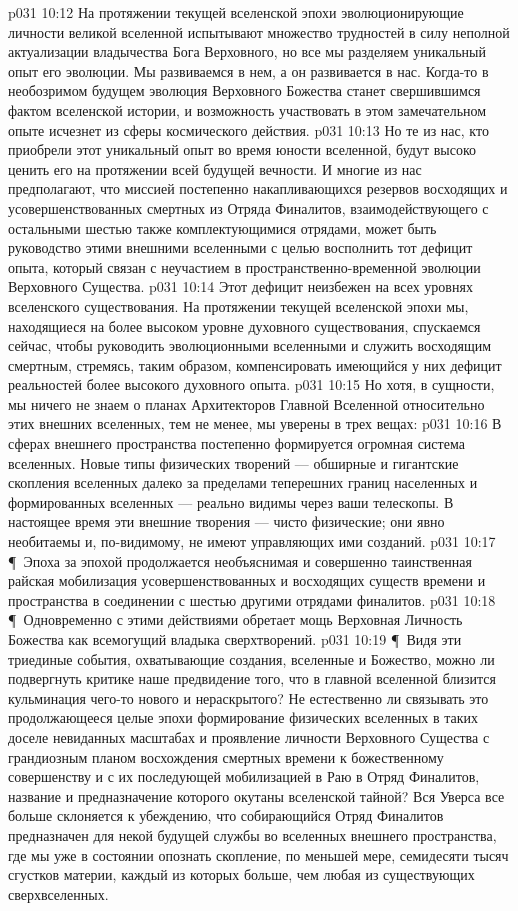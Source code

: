 \vs p031 10:12 На протяжении текущей вселенской эпохи эволюционирующие личности великой вселенной испытывают множество трудностей в силу неполной актуализации владычества Бога Верховного, но все мы разделяем уникальный опыт его эволюции. Мы развиваемся в нем, а он развивается в нас. Когда\hyp{}то в необозримом будущем эволюция Верховного Божества станет свершившимся фактом вселенской истории, и возможность участвовать в этом замечательном опыте исчезнет из сферы космического действия.
\vs p031 10:13 Но те из нас, кто приобрели этот уникальный опыт во время юности вселенной, будут высоко ценить его на протяжении всей будущей вечности. И многие из нас предполагают, что миссией постепенно накапливающихся резервов восходящих и усовершенствованных смертных из Отряда Финалитов, взаимодействующего с остальными шестью также комплектующимися отрядами, может быть руководство этими внешними вселенными с целью восполнить тот дефицит опыта, который связан с неучастием в пространственно\hyp{}временной эволюции Верховного Существа.
\vs p031 10:14 Этот дефицит неизбежен на всех уровнях вселенского существования. На протяжении текущей вселенской эпохи мы, находящиеся на более высоком уровне духовного существования, спускаемся сейчас, чтобы руководить эволюционными вселенными и служить восходящим смертным, стремясь, таким образом, компенсировать имеющийся у них дефицит реальностей более высокого духовного опыта.
\vs p031 10:15 Но хотя, в сущности, мы ничего не знаем о планах Архитекторов Главной Вселенной относительно этих внешних вселенных, тем не менее, мы уверены в трех вещах:
\vs p031 10:16 \bibnobreakspace В сферах внешнего пространства постепенно формируется огромная система вселенных. Новые типы физических творений --- обширные и гигантские скопления вселенных далеко за пределами теперешних границ населенных и формированных вселенных --- реально видимы через ваши телескопы. В настоящее время эти внешние творения --- чисто физические; они явно необитаемы и, по\hyp{}видимому, не имеют управляющих ими созданий.
\vs p031 10:17 \P\ \bibnobreakspace Эпоха за эпохой продолжается необъяснимая и совершенно таинственная райская мобилизация усовершенствованных и восходящих существ времени и пространства в соединении с шестью другими отрядами финалитов.
\vs p031 10:18 \P\ \bibnobreakspace Одновременно с этими действиями обретает мощь Верховная Личность Божества как всемогущий владыка сверхтворений.
\vs p031 10:19 \P\ Видя эти триединые события, охватывающие создания, вселенные и Божество, можно ли подвергнуть критике наше предвидение того, что в главной вселенной близится кульминация чего\hyp{}то нового и нераскрытого? Не естественно ли связывать это продолжающееся целые эпохи формирование физических вселенных в таких доселе невиданных масштабах и проявление личности Верховного Существа с грандиозным планом восхождения смертных времени к божественному совершенству и с их последующей мобилизацией в Раю в Отряд Финалитов, название и предназначение которого окутаны вселенской тайной? Вся Уверса все больше склоняется к убеждению, что собирающийся Отряд Финалитов предназначен для некой будущей службы во вселенных внешнего пространства, где мы уже в состоянии опознать скопление, по меньшей мере, семидесяти тысяч сгустков материи, каждый из которых больше, чем любая из существующих сверхвселенных.
